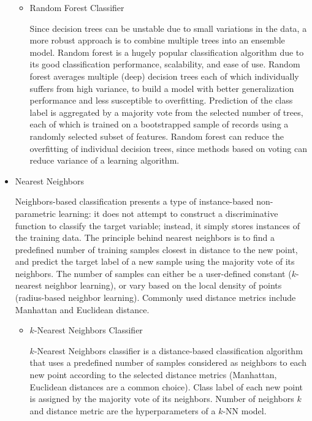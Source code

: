 \begin{itemize}
\begin{itemize}
        \item Random Forest Classifier

        Since decision trees can be unstable due to small variations in the data, a more robust approach is to combine multiple trees into an ensemble model.
        Random forest is a hugely popular classification algorithm due to its good classification performance, scalability, and ease of use\cite{RaschkaMirjalili2017}.
        Random forest averages multiple (deep) decision trees each of which individually suffers from high variance, to build a model with better generalization performance and less susceptible to overfitting.
        Prediction of the class label is aggregated by a majority vote from the selected number of trees, each of which is trained on a bootstrapped sample of records using a randomly selected subset of features.
        Random forest can reduce the overfitting of individual decision trees, since methods based on voting can reduce variance of a learning algorithm\cite{Dietterich1995}.

    \end{itemize}

    \item Nearest Neighbors


    Neighbors-based classification presents a type of instance-based non-parametric learning: it does not attempt to construct a discriminative function to classify the target variable;
    instead, it simply stores instances of the training data.
    The principle behind nearest neighbors is to find a predefined number of training samples closest in distance to the new point, and predict the target label of a new sample using the majority vote of its neighbors.
    The number of samples can either be a user-defined constant ($k$-nearest neighbor learning), or vary based on the local density of points (radius-based neighbor learning).
    Commonly used distance metrics include Manhattan and Euclidean distance.

    \begin{itemize}

        \item $k$-Nearest Neighbors Classifier

        $k$-Nearest Neighbors classifier is a distance-based classification algorithm that uses a predefined number of samples considered as neighbors to each new point according to the selected distance metrics (Manhattan, Euclidean distances are a common choice).
        Class label of each new point is assigned by the majority vote of its neighbors.
        Number of neighbors $k$ and distance metric are the hyperparameters of a $k$-NN model.

    \end{itemize}

\end{itemize}

